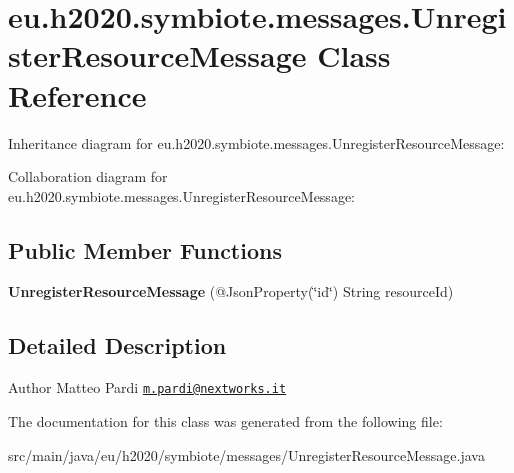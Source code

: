 \hypertarget{classeu_1_1h2020_1_1symbiote_1_1messages_1_1UnregisterResourceMessage}{}\section{eu.\+h2020.\+symbiote.\+messages.\+Unregister\+Resource\+Message Class Reference}
\label{classeu_1_1h2020_1_1symbiote_1_1messages_1_1UnregisterResourceMessage}


Inheritance diagram for eu.\+h2020.\+symbiote.\+messages.\+Unregister\+Resource\+Message\+:


Collaboration diagram for eu.\+h2020.\+symbiote.\+messages.\+Unregister\+Resource\+Message\+:
\subsection*{Public Member Functions}
\begin{DoxyCompactItemize}
\item 
\mbox{\label{classeu_1_1h2020_1_1symbiote_1_1messages_1_1UnregisterResourceMessage_aa8096b9b5599275bf05f98197d3c606d}} 
{\bfseries Unregister\+Resource\+Message} (@Json\+Property(\char`\"{}id\char`\"{}) String resource\+Id)
\end{DoxyCompactItemize}


\subsection{Detailed Description}
\begin{DoxyAuthor}{Author}
Matteo Pardi \href{mailto:m.pardi@nextworks.it}{\tt m.\+pardi@nextworks.\+it} 
\end{DoxyAuthor}


The documentation for this class was generated from the following file\+:\begin{DoxyCompactItemize}
\item 
src/main/java/eu/h2020/symbiote/messages/Unregister\+Resource\+Message.\+java\end{DoxyCompactItemize}
